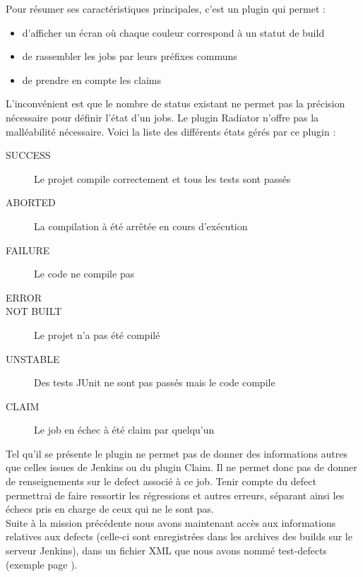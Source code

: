 Pour résumer ses caractéristiques principales, c'est un plugin qui permet :
\begin{itemize}
	\item d'afficher un écran  où chaque couleur correspond à un statut de build
	\item de rassembler les jobs par leurs préfixes communs
	\item de prendre en compte les claims
\end{itemize}

L'inconvénient est que le nombre de status existant ne permet pas la précision nécessaire pour définir l'état d'un jobs. Le plugin Radiator n'offre pas la malléabilité nécessaire. Voici la liste des différents états gérés par ce plugin : 
\begin{description}
	\item[SUCCESS] Le projet compile correctement et tous les tests sont passés
	\item[ABORTED] La compilation à été arrêtée en cours d'exécution
	\item[FAILURE] Le code ne compile pas
	\item[ERROR]
	\item[NOT BUILT] Le projet n'a pas été compilé
	\item[UNSTABLE] Des tests JUnit ne sont pas passés mais le code compile
	\item[CLAIM] Le job en échec à été claim par quelqu'un
\end{description}



Tel qu'il se présente le plugin ne permet pas de donner des informations autres que celles issues de Jenkins ou du plugin Claim. Il ne permet donc pas de donner de renseignements sur le defect associé à ce job. Tenir compte du defect permettrai de faire ressortir les régressions et autres erreurs, séparant ainsi les échecs pris en charge de ceux qui ne le sont pas.\\
Suite à la mission précédente nous avons maintenant accès aux informations relatives aux defects (celle-ci sont enregistrées dans les archives des builds sur le serveur Jenkins), dans un fichier XML que nous avons nommé test-defects (exemple page \pageref{testdefectxml}).\\



